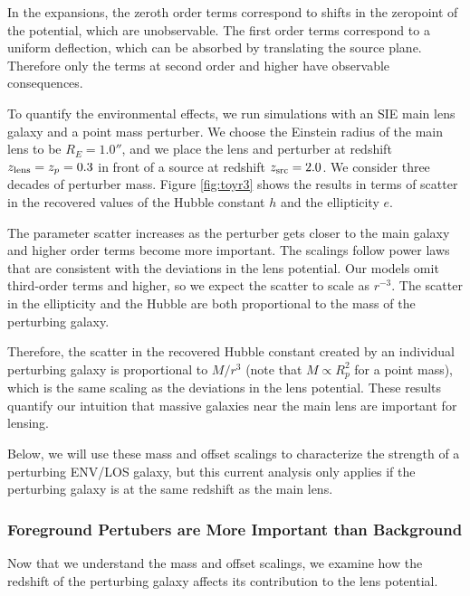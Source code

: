 \documentclass{emulateapj}
\providecommand{\DIFaddtex}[1]{{\protect\color{blue}\uwave{#1}}} %
\providecommand{\DIFaddbegin}{} %
\providecommand{\DIFaddend}{} %
\providecommand{\DIFadd}[1]{\texorpdfstring{\DIFaddtex{#1}}{#1}} %
\begin{document}
In the expansions, the zeroth order terms correspond to shifts in the zeropoint of the potential, which are unobservable.  The first order terms correspond to a uniform deflection, which can be absorbed by translating the source plane.  Therefore only the terms at second order and higher have observable consequences.

To quantify the environmental effects, we run simulations with an SIE main lens galaxy and a point mass perturber.  We choose the Einstein radius of the main lens to be $R_E = 1.0''$, and we place the lens and perturber at redshift $z_{\rm{lens}} = z_p = 0.3$ in front of a source at redshift $z_{\rm{src}} = 2.0$.  We consider three decades of perturber mass.  Figure \ref{fig:toyr3} shows the results in terms of scatter in the recovered values of the Hubble constant $h$ and the ellipticity $e$.

The parameter scatter increases as the perturber gets closer to the main galaxy and higher order terms become more important.  The scalings follow power laws that are consistent with the deviations in the lens potential. Our models omit third-order terms and higher, so we expect the scatter to scale as $r^{-3}$. The scatter in the ellipticity and the Hubble \DIFaddbegin \DIFadd{constant }\DIFaddend are both proportional to the mass of the perturbing galaxy. 

Therefore, the scatter in the recovered Hubble constant created by an individual perturbing galaxy is proportional to $M / r^3$ (note that $ M \propto R_p^2$ for a point mass), which is the same scaling as the deviations in the lens potential. These results quantify our intuition that massive galaxies near the main lens are important for lensing. 

Below, we will use these mass and offset scalings to characterize the strength of a perturbing ENV/LOS galaxy, but this current analysis only applies if the perturbing galaxy is at the same redshift as the main lens.

\subsubsection{Foreground Pertubers are More Important than Background}
\label{sec:frontback}

Now that we understand the mass and offset scalings, we examine how the redshift of the perturbing galaxy affects its contribution to the lens potential. 
\end{document}
